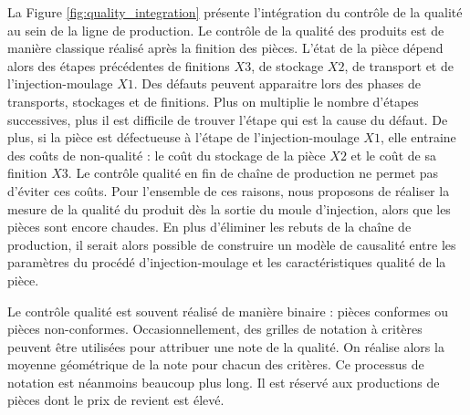 La Figure \ref{fig:quality_integration} présente l'intégration du contrôle de la qualité au sein de la ligne de production.
Le contrôle de la qualité des produits est de manière classique réalisé après la finition des pièces.
L'état de la pièce dépend alors des étapes précédentes de finitions $X3$, de stockage $X2$, de transport et de l'injection-moulage $X1$.
Des défauts peuvent apparaitre lors des phases de transports, stockages et de finitions.
Plus on multiplie le nombre d'étapes successives, plus il est difficile de trouver l'étape qui est la cause du défaut.
De plus, si la pièce est défectueuse à l'étape de l'injection-moulage $X1$, elle entraine des coûts de non-qualité : le coût du stockage de la pièce $X2$ et le coût de sa finition $X3$.
Le contrôle qualité en fin de chaîne de production ne permet pas d'éviter ces coûts.
Pour l'ensemble de ces raisons, nous proposons de réaliser la mesure de la qualité du produit dès la sortie du moule d'injection, alors que les pièces sont encore chaudes.
En plus d'éliminer les rebuts de la chaîne de production, il serait alors possible de construire un modèle de causalité entre les paramètres du procédé d'injection-moulage et les caractéristiques qualité de la pièce.

Le contrôle qualité est souvent réalisé de manière binaire : pièces conformes ou pièces non-conformes.
Occasionnellement, des grilles de notation à critères peuvent être utilisées pour attribuer une note de la qualité.
On réalise alors la moyenne géométrique de la note pour chacun des critères.
Ce processus de notation est néanmoins beaucoup plus long.
Il est réservé aux productions de pièces dont le prix de revient est élevé.

